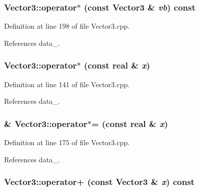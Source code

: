 \subsubsection[{operator$\ast$}]{ Vector3::operator$\ast$ (const {\bf Vector3} \& {\em vb}) const}\label{classVector3_abd1ce86e44c16023a8e5527b1ab58c4c}


Definition at line 198 of file Vector3.cpp.



References data\_\-.

\subsubsection[{operator$\ast$}]{ Vector3::operator$\ast$ (const {\bf real} \& {\em x})}\label{classVector3_ae3dce9c6ce9eb2c7cc0cac441b117070}


Definition at line 141 of file Vector3.cpp.



References data\_\-.

\subsubsection[{operator$\ast$=}]{ \& Vector3::operator$\ast$= (const {\bf real} \& {\em x})}\label{classVector3_a6050e2dbdfe59ac8738390a37e4b705c}


Definition at line 175 of file Vector3.cpp.



References data\_\-.

\subsubsection[{operator+}]{ Vector3::operator+ (const {\bf Vector3} \& {\em x}) const}\label{classVector3_a8148b32df1f3e85dfdbd360c8832a060}


